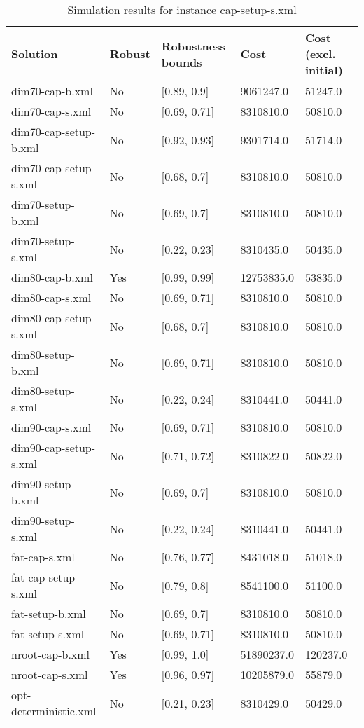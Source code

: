 \begin{table}[!hbp]
\label{tab:instance4_results}
\begin{tabular}{lllll}
\hline
Solution 	& Robust  	& Robustness bounds 	& Cost 	& Cost (excl. initial) \\
\hline
\hline
dim70-cap-b.xml 	& No 	&  [0.89, 0.9] 	& 9061247.0 	& 51247.0\\
dim70-cap-s.xml 	& No 	&  [0.69, 0.71] 	& 8310810.0 	& 50810.0\\
dim70-cap-setup-b.xml 	& No 	&  [0.92, 0.93] 	& 9301714.0 	& 51714.0\\
dim70-cap-setup-s.xml 	& No 	&  [0.68, 0.7] 	& 8310810.0 	& 50810.0\\
dim70-setup-b.xml 	& No 	&  [0.69, 0.7] 	& 8310810.0 	& 50810.0\\
dim70-setup-s.xml 	& No 	&  [0.22, 0.23] 	& 8310435.0 	& 50435.0\\
dim80-cap-b.xml 	& Yes 	&  [0.99, 0.99] 	& 12753835.0 	& 53835.0\\
dim80-cap-s.xml 	& No 	&  [0.69, 0.71] 	& 8310810.0 	& 50810.0\\
dim80-cap-setup-s.xml 	& No 	&  [0.68, 0.7] 	& 8310810.0 	& 50810.0\\
dim80-setup-b.xml 	& No 	&  [0.69, 0.71] 	& 8310810.0 	& 50810.0\\
dim80-setup-s.xml 	& No 	&  [0.22, 0.24] 	& 8310441.0 	& 50441.0\\
dim90-cap-s.xml 	& No 	&  [0.69, 0.71] 	& 8310810.0 	& 50810.0\\
dim90-cap-setup-s.xml 	& No 	&  [0.71, 0.72] 	& 8310822.0 	& 50822.0\\
dim90-setup-b.xml 	& No 	&  [0.69, 0.7] 	& 8310810.0 	& 50810.0\\
dim90-setup-s.xml 	& No 	&  [0.22, 0.24] 	& 8310441.0 	& 50441.0\\
fat-cap-s.xml 	        & No 	&  [0.76, 0.77] 	& 8431018.0 	& 51018.0\\
fat-cap-setup-s.xml 	& No 	&  [0.79, 0.8] 	& 8541100.0 	& 51100.0\\
fat-setup-b.xml 	& No 	&  [0.69, 0.7] 	& 8310810.0 	& 50810.0\\
fat-setup-s.xml 	& No 	&  [0.69, 0.71] 	& 8310810.0 	& 50810.0\\
nroot-cap-b.xml 	& Yes 	&  [0.99, 1.0] 	        & 51890237.0 	& 120237.0\\
nroot-cap-s.xml 	& Yes 	&  [0.96, 0.97] 	& 10205879.0 	& 55879.0\\
opt-deterministic.xml 	& No 	&  [0.21, 0.23] 	& 8310429.0 	& 50429.0\\
\hline
\end{tabular}
\caption{Simulation results for instance cap-setup-s.xml}
\end{table}


